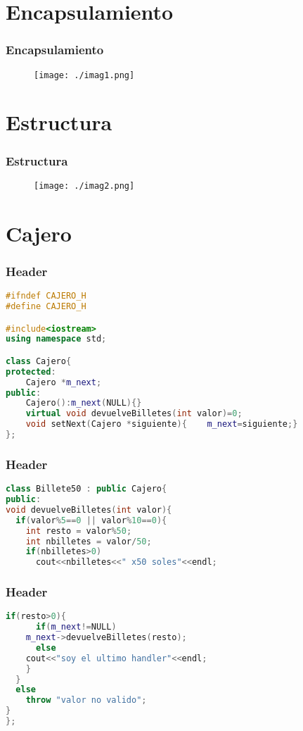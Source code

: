 \documentclass[xcolor=dvipsnames]{beamer}
\begin{document}
\section{Encapsulamiento}
\begin{frame}
 \frametitle{Encapsulamiento}
 \begin{figure}
 \centering
 \texttt{[image: ./imag1.png]}
 \label{fig:1}
\end{figure}
\end{frame}

\section{Estructura}
\begin{frame}
 \frametitle{Estructura}
 \begin{figure}
 \centering
 \texttt{[image: ./imag2.png]}
 \label{fig:2}
\end{figure}

\end{frame}


\section{Cajero}
\begin{frame}[fragile]
 \frametitle{Header}
 \begin{lstlisting}[language=C++]
#ifndef CAJERO_H
#define CAJERO_H

#include<iostream>
using namespace std;

class Cajero{
protected:
    Cajero *m_next;
public:
    Cajero():m_next(NULL){}
    virtual void devuelveBilletes(int valor)=0;
    void setNext(Cajero *siguiente){    m_next=siguiente;}
};
  \end{lstlisting}
\end{frame}

\begin{frame}[fragile]
 \frametitle{Header}
 \begin{lstlisting}[language=C++]
class Billete50 : public Cajero{
public:
void devuelveBilletes(int valor){
  if(valor%5==0 || valor%10==0){
    int resto = valor%50;
    int nbilletes = valor/50;
    if(nbilletes>0)
      cout<<nbilletes<<" x50 soles"<<endl;      
  \end{lstlisting}
\end{frame}

\begin{frame}[fragile]
 \frametitle{Header}
 \begin{lstlisting}[language=C++]
    if(resto>0){
      if(m_next!=NULL)
	m_next->devuelveBilletes(resto);
      else
	cout<<"soy el ultimo handler"<<endl;
    }
  }
  else
    throw "valor no valido";
}
};
 \end{lstlisting}
\end{frame}
\end{document}
